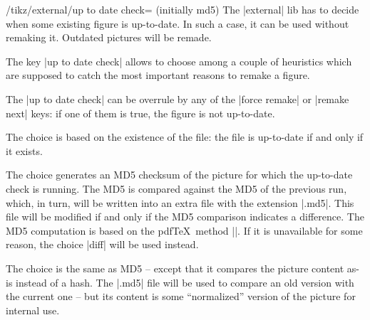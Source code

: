 {

\begin{key}{/tikz/external/up to date check= (initially md5)}
    The |external| lib has to decide when some existing figure is up-to-date.
    In such a case, it can be used without remaking it. Outdated pictures will
    be remade.

    The key |up to date check| allows to choose among a couple of heuristics
    which are supposed to catch the most important reasons to remake a figure.

    The |up to date check| can be overrule by any of the |force remake| or
    |remake next| keys: if one of them is true, the figure is not up-to-date.

    The choice  is based on the existence of the file: the file
    is up-to-date if and only if it exists.

    The choice  generates an MD5 checksum of the picture for which
    the up-to-date check is running. The MD5 is compared against the MD5 of the
    previous run, which, in turn, will be written into an extra file with the
    extension |.md5|. This file will be modified if and only if the MD5
    comparison indicates a difference. The MD5 computation is based on the
    pdf\TeX\ method |\pdfmdfivesum|. If it is unavailable for some reason, the
    choice |diff| will be used instead.

    The choice  is the same as MD5 -- except that it compares the
    picture content as-is instead of a hash. The |.md5| file will be used to
    compare an old version with the current one -- but its content is some
    ``normalized'' version of the picture for internal use.


\end{key}}
